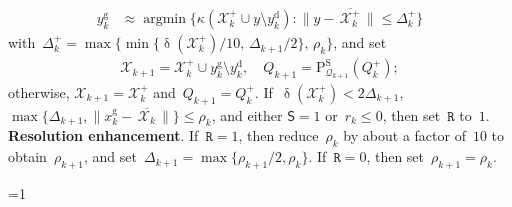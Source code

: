 \documentclass[11pt,a4paper,draft]{article}  %
\newcommand{\bibfile}{\jobname.bib}  %
\newcommand{\iscite}{0}  %
\theoremstyle{definition}
\numberwithin{equation}{section}
\newcommand{\mbar}[1]{\,\overline{\!{#1}\!}\,} %
\newcommand{\xopt}{\mbar}
\DeclareMathOperator{\xdist}{\updelta}
\DeclareMathOperator*{\argmin}{argmin}
\newcommand{\shortd}{\mathsf{S}}
\newcommand{\redrho}{\mathtt{R}}
\newcommand{\Int}{\mathcal{X}}
\newcommand{\Qua}{\mathcal{Q}}
\newcommand{\sss}[1]{{\scriptscriptstyle{#1}}}
\newcommand{\get}{{\textrm{g}}}
\newcommand{\drop}{{\textrm{d}}}
\newcommand{\new}{{\sss{+}}}
\newcommand{\sob}{{\scriptscriptstyle{\textrm{S}}}}
\newcommand{\Projs}{\mathrm{P}^\sob}
\begin{document}
\begin{algorithm}[htbp!]
\begin{algorithmic}[1]
\begin{align}
              \label{eq:ygetn}
              y_k^\get &\approx \argmin\{\kappa(\Int^{\new}_k \cup y \setminus y_k^\drop) \mathrel{:}
              \|y-\xopt{\Int^{\new}_k}\|\le \Delta^{\new}_k\}
          \end{align}
          with~$\Delta^{\new}_k = \max\{\min\{\xdist(\Int_k^\new)/10,\,
          \Delta_{k+1}/2\},\,\rho_{k}\}$, and set
          \begin{align}
              \Int_{k+1} = \Int^{\new}_k\cup y_k^\get\setminus y_k^\drop,
              \quad
              Q_{k+1} = \Projs_{\Qua_{k+1}}(Q_k^\new) ;
          \end{align}
          otherwise, $\Int_{k+1} = \Int_k^\new$ and~$Q_{k+1} = Q_k^{\new}$.
          If~$\xdist(\Int_k^{\new}) < 2\Delta_{k+1}$, $\max\{\Delta_{k+1}, \|x_k^\get
          - \xopt{\Int_k}\|\}\le \rho_k$, and either $\shortd=1$ or~$r_k\le 0$,
          then set~$\redrho$ to~$1$.
       \State \textbf{Resolution enhancement}.
       If~$\redrho = 1$, then reduce~$\rho_k$ by about a factor of~$10$ to
       obtain~$\rho_{k+1}$, and set~$\Delta_{k+1} = \max\{\rho_{k+1}/2, \rho_k\}$.
       If~$\redrho = 0$, then set~$\rho_{k+1} = \rho_k$.
    \end{algorithmic}
\end{algorithm}


\ifnum\iscite=1
    \small
    
    
\fi

\end{document}
